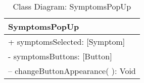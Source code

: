 \begin{table}[ht]
\centering
\caption{Class Diagram: SymptomsPopUp}

\hspace{1em}
\renewcommand{\arraystretch}{1.7}

\begin{tabular}{|l|}
\hline
\textbf{SymptomsPopUp} \\
\hline
+ symptomsSelected: [Symptom] \\
- symptomsButtons: [Button] \\
\hdashline
– changeButtonAppearance( ): Void \\
\hline
\end{tabular}
\end{table}

